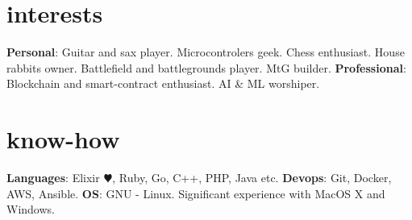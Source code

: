 \documentclass[]{cv-style}
\begin{document}
\section{interests}

\textbf{Personal}: Guitar and sax player. Microcontrolers geek. Chess enthusiast. House rabbits owner. Battlefield and battlegrounds player. MtG builder. \textbf{Professional}: Blockchain and smart-contract enthusiast. AI \& ML worshiper.


\section{know-how}
  \textbf{Languages}: Elixir {\color{red} $\varheartsuit$}, Ruby, Go, C++, PHP, Java etc.
  \textbf{Devops}: Git, Docker, AWS, Ansible.
  \textbf{OS}: GNU - Linux. Significant experience with MacOS X and Windows.
\end{document}
